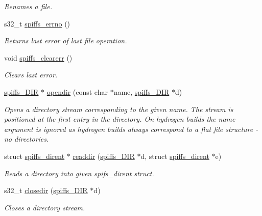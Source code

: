 \begin{DoxyCompactItemize}
\begin{DoxyCompactList}\small\item\em Renames a file. \end{DoxyCompactList}\item 
\mbox{\label{class_spiffs_particle_a638a65a354cc57c4a89fc19af1568cbb}} 
s32\+\_\+t \mbox{\hyperlink{class_spiffs_particle_a638a65a354cc57c4a89fc19af1568cbb}{spiffs\+\_\+errno}} ()
\begin{DoxyCompactList}\small\item\em Returns last error of last file operation. \end{DoxyCompactList}\item 
void \mbox{\hyperlink{class_spiffs_particle_af89255deb61819ea561163652784dcf1}{spiffs\+\_\+clearerr}} ()
\begin{DoxyCompactList}\small\item\em Clears last error. \end{DoxyCompactList}\item 
\mbox{\hyperlink{structspiffs___d_i_r}{spiffs\+\_\+\+D\+IR}} $\ast$ \mbox{\hyperlink{class_spiffs_particle_ae2fdc1f28c8a83a55d9e2b18c734f631}{opendir}} (const char $\ast$name, \mbox{\hyperlink{structspiffs___d_i_r}{spiffs\+\_\+\+D\+IR}} $\ast$d)
\begin{DoxyCompactList}\small\item\em Opens a directory stream corresponding to the given name. The stream is positioned at the first entry in the directory. On hydrogen builds the name argument is ignored as hydrogen builds always correspond to a flat file structure -\/ no directories. \end{DoxyCompactList}\item 
struct \mbox{\hyperlink{structspiffs__dirent}{spiffs\+\_\+dirent}} $\ast$ \mbox{\hyperlink{class_spiffs_particle_a258d05b35100c4b20fdd090810392e56}{readdir}} (\mbox{\hyperlink{structspiffs___d_i_r}{spiffs\+\_\+\+D\+IR}} $\ast$d, struct \mbox{\hyperlink{structspiffs__dirent}{spiffs\+\_\+dirent}} $\ast$e)
\begin{DoxyCompactList}\small\item\em Reads a directory into given spifs\+\_\+dirent struct. \end{DoxyCompactList}\item 
s32\+\_\+t \mbox{\hyperlink{class_spiffs_particle_a6b7038ef799d9c369fac7d52f94032d3}{closedir}} (\mbox{\hyperlink{structspiffs___d_i_r}{spiffs\+\_\+\+D\+IR}} $\ast$d)
\begin{DoxyCompactList}\small\item\em Closes a directory stream. \end{DoxyCompactList}\item 

\end{DoxyCompactItemize}
